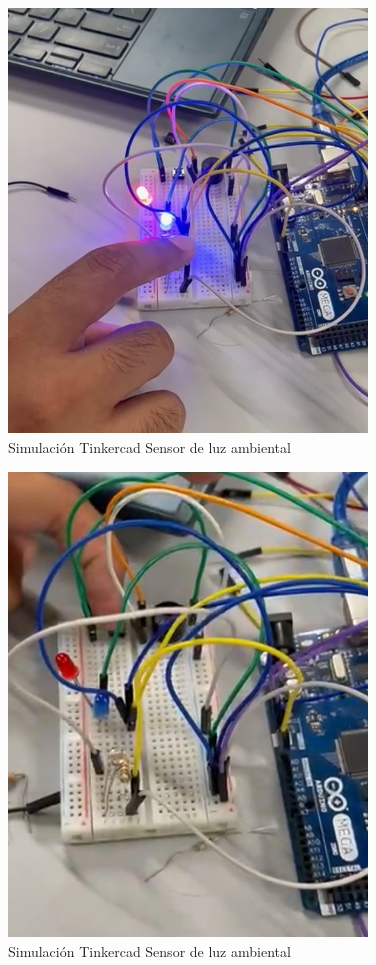 \begin{figure}[H]
    \centering
    \includegraphics[width=0.85\textwidth]{img/sensores_chkp_2.png}
    \caption{Simulación Tinkercad Sensor de luz ambiental}
    \label{fig:luz_ambiental}
\end{figure}

\begin{figure}[H]
    \centering
    \includegraphics[width=0.85\textwidth]{img/sensores_chkp_2_1.png}
    \caption{Simulación Tinkercad Sensor de luz ambiental}
    \label{fig:luz_ambiental}
\end{figure}


